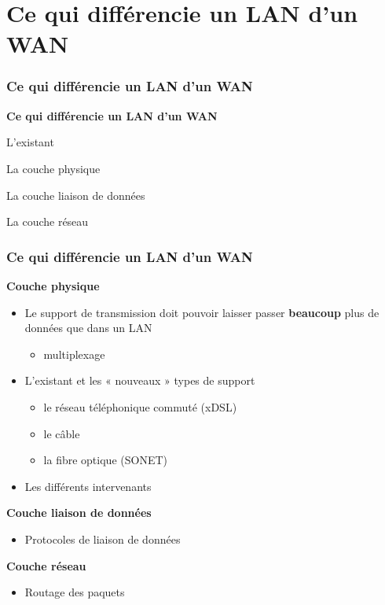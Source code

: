 \section{Ce qui différencie un LAN d'un WAN}

\begin{frame}[fragile]
  \frametitle{Ce qui différencie un LAN d'un WAN}
\begin{center}
	\Huge{\bf\color{blue}Ce qui différencie un LAN d'un WAN}
\end{center}
\begin{flushright}
  \item L'existant
  \item La couche physique
  \item La couche liaison de données
  \item La couche réseau
\end{flushright}
\end{frame}

\begin{frame}[fragile]
  \frametitle{Ce qui différencie un LAN d'un WAN}
\textbf{Couche physique}
\begin{itemize}
	\item Le support de transmission doit pouvoir laisser passer
	\textbf{beaucoup} plus de données que dans un LAN
	\begin{itemize}
		\item multiplexage
	\end{itemize}
	\item L'existant et les « nouveaux » types de support
	\begin{itemize}
		\item le réseau téléphonique commuté (xDSL)
		\item le câble
		\item la fibre optique (SONET)
	\end{itemize}
	\item Les différents intervenants
\end{itemize}
\textbf{Couche liaison de données}
	\begin{itemize}
		\item Protocoles de liaison de données
	\end{itemize}
\textbf{Couche réseau}
	\begin{itemize}
		\item Routage des paquets
	\end{itemize}
\end{frame}

